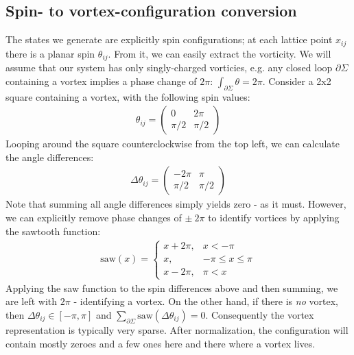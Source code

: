 \documentclass[]{article}
\begin{document}
\subsection{Spin- to vortex-configuration conversion}
The states we generate are explicitly spin configurations; at each lattice point $x_{ij}$ there is a planar spin $\theta_{ij}$. From it, we can easily extract the vorticity. We will assume that our system has only singly-charged vorticies, e.g. any closed loop $\partial\Sigma$ containing a vortex implies a phase change of $2\pi$: $\int_{\partial\Sigma} \theta = 2\pi$. Consider a 2x2 square containing a vortex, with the following spin values:
\begin{align}
\theta_{ij} = \begin{pmatrix} 0 & 2\pi \\ \pi/2 & \pi/2\end{pmatrix}
\end{align}
Looping around the square counterclockwise from the top left, we can calculate the angle differences:
\begin{align}
\Delta\theta_{ij} = \begin{pmatrix}
-2\pi & \pi\\ \pi/2 & \pi/2
\end{pmatrix}
\end{align}
Note that summing all angle differences simply yields zero - as it must. However, we can explicitly remove phase changes of $\pm\ 2\pi$ to identify vortices by applying the sawtooth function:
\begin{align}
\text{saw}(x) = \begin{cases} 
x+2\pi, & x < -\pi \\
x, & -\pi \leq x \leq \pi \\
x-2\pi, & \pi < x
\end{cases}
\end{align}
Applying the saw function to the spin differences above and then summing, we are left with $2\pi$ - identifying a vortex. On the other hand, if there is \textit{no} vortex, then $\Delta \theta_{ij} \in [-\pi, \pi]$ and $\sum_{\partial\Sigma}\text{saw}(\Delta\theta_{ij}) = 0$. Consequently the vortex representation is typically very sparse. After normalization, the configuration will contain mostly zeroes and a few ones here and there where a vortex lives.
\end{document}
